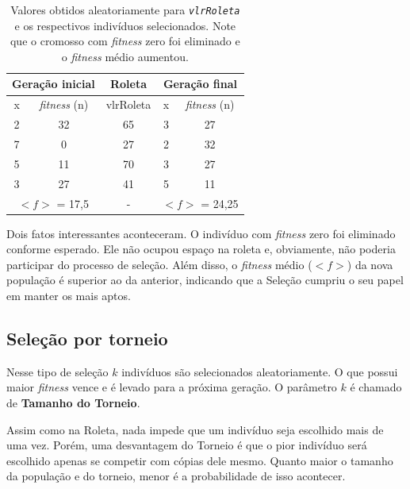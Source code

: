 \begin{table}[htp]
	\caption{\label{tabRoletaManual}Valores obtidos aleatoriamente para \textit{\texttt{vlrRoleta}} e os respectivos indivíduos selecionados. Note que o cromosso com \textit{fitness} zero foi eliminado e o \textit{fitness} médio aumentou.}
	\begin{center}
		\begin{tabular}{c|c|c|c|c}
			\hline
			\multicolumn{2}{c|}{\textbf{Geração inicial}} & \textbf{Roleta}& \multicolumn{2}{c}{\textbf{Geração final}}  \\
			\hline
			x 					& \textit{fitness} (n)	& vlrRoleta						& x						& \textit{fitness} (n)	\\
			\hline
			2 					& 32										& 65 									& 3						&	27   \\
			7 					& 0 										& 27 									& 2						&	32\\
			5 					& 11										& 70 									& 3						&	27\\	
			3 					& 27										& 41 									& 5						&	11\\
			\hline
			\multicolumn{2}{c|}{$<f>$ = 17,5} & - & \multicolumn{2}{c}{$<f>$ = 24,25}  \\
			\hline
		\end{tabular}
	\end{center}
\end{table}
	
	Dois fatos interessantes aconteceram. O indivíduo com \textit{fitness} zero foi eliminado conforme esperado. Ele não ocupou espaço na roleta e, obviamente, não poderia participar do processo de seleção. Além disso, o \textit{fitness} médio ($<f>$) da nova população é superior ao da anterior, indicando que a Seleção cumpriu o seu papel em manter os mais aptos.
	
	\subsection{Seleção por torneio}\label{sec:torneio}
	
	Nesse tipo de seleção $k$ indivíduos são selecionados aleatoriamente. O que possui maior \emph{fitness} vence e é levado para a próxima geração. O parâmetro $k$ é chamado de \textbf{Tamanho do Torneio}.
	
	Assim como na Roleta, nada impede que um indivíduo seja escolhido mais de uma vez. Porém, uma desvantagem do Torneio é que o pior indivíduo será escolhido apenas se competir com cópias dele mesmo. Quanto maior o tamanho da população e do torneio, menor é a probabilidade de isso acontecer.
	

